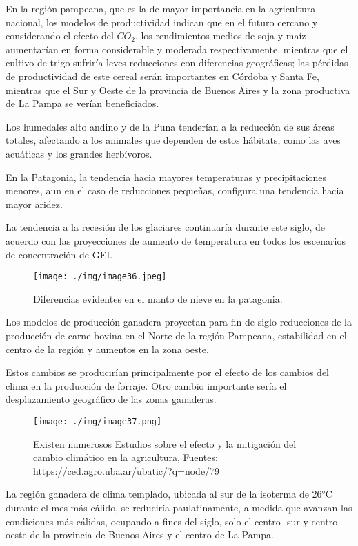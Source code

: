 \documentclass[
  a4paper,12pt]{extarticle}
\begin{document}
En la región pampeana, que es la de mayor importancia en la agricultura
nacional, los modelos de productividad indican que en el futuro cercano
y considerando el efecto del \(CO_2\), los rendimientos medios de soja y
maíz aumentarían en forma considerable y moderada respectivamente,
mientras que el cultivo de trigo sufriría leves reducciones con
diferencias geográficas; las pérdidas de productividad de este cereal
serán importantes en Córdoba y Santa Fe, mientras que el Sur y Oeste de
la provincia de Buenos Aires y la zona productiva de La Pampa se verían
beneficiados.

Los humedales alto andino y de la Puna tenderían a la reducción de sus
áreas totales, afectando a los animales que dependen de estos hábitats,
como las aves acuáticas y los grandes herbívoros.

En la Patagonia, la tendencia hacia mayores temperaturas y
precipitaciones menores, aun en el caso de reducciones pequeñas,
configura una tendencia hacia mayor aridez.

La tendencia a la recesión de los glaciares continuaría durante este
siglo, de acuerdo con las proyecciones de aumento de temperatura en
todos los escenarios de concentración de GEI.

\begin{figure}
\centering
\texttt{[image: ./img/image36.jpeg]}
\caption{Diferencias evidentes en el manto de nieve en la patagonia.}
\end{figure}

Los modelos de producción ganadera proyectan para fin de siglo
reducciones de la producción de carne bovina en el Norte de la región
Pampeana, estabilidad en el centro de la región y aumentos en la zona
oeste.

Estos cambios se producirían principalmente por el efecto de los cambios
del clima en la producción de forraje. Otro cambio importante sería el
desplazamiento geográfico de las zonas ganaderas.

\begin{figure}
\centering
\texttt{[image: ./img/image37.png]}
\caption{Existen numerosos Estudios sobre el efecto y la mitigación del
cambio climático en la agricultura, Fuentes:
\url{https://ced.agro.uba.ar/ubatic/?q=node/79}}
\end{figure}

La región ganadera de clima templado, ubicada al sur de la isoterma de
26°C durante el mes más cálido, se reduciría paulatinamente, a medida
que avanzan las condiciones más cálidas, ocupando a fines del siglo,
solo el centro- sur y centro-oeste de la provincia de Buenos Aires y el
centro de La Pampa.
\end{document}
